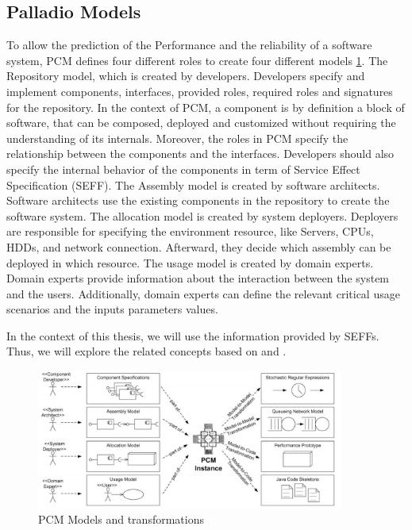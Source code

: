 \subsection{Palladio Models}
\label{sec: Palladio Models}
To allow the prediction of the Performance and the reliability of a software system, PCM defines four different roles to create four different models \ref{fig:PCM Models and transformations}. The Repository model, which is created by developers. Developers specify and implement components, interfaces, provided roles, required roles and signatures for the repository. In the context of PCM, a component is by definition a block of software, that can be composed, deployed and customized without requiring the understanding of its internals.  Moreover, the roles in PCM specify the relationship between the components and the interfaces. Developers should also specify the internal behavior of the components in term of Service Effect Specification (SEFF). The Assembly model is created by software architects. Software architects use the existing components in the repository to create the software system. The allocation model is created by system deployers.  Deployers are responsible for specifying the environment resource, like Servers, CPUs, HDDs, and network connection. Afterward, they decide which assembly can be deployed in which resource. The usage model is created by domain experts. Domain experts provide information about the interaction between the system and the users. Additionally, domain experts can define the relevant critical usage scenarios and the inputs parameters values. 

In the context of this thesis, we will use the information provided by SEFFs. Thus, we will explore the related concepts based on \cite{becker2009palladio} and \cite{koziolek2006parameter}.

\begin{figure}[h]
\centering
\includegraphics[width=0.9\textwidth]{figures/pcmmodels}
\caption{PCM Models and transformations \cite{reussner2016modeling}}
\label{fig:PCM Models and transformations}
\end{figure}



